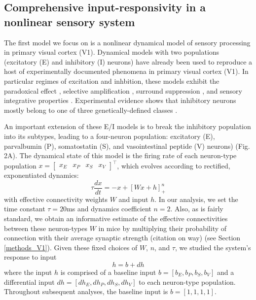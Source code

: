 \documentclass[11pt]{article}
\begin{document}
\subsection{Comprehensive input-responsivity in a nonlinear sensory system} \label{results_V1}
The first model we focus on is a nonlinear dynamical model of sensory processing in primary visual cortex (V1).
Dynamical models with two populations (excitatory (E) and inhibitory (I) neurons) have already been used to reproduce a host of experimentally documented phenomena in primary visual cortex (V1).  In particular regimes of excitation and inhbition, these models exhibit the paradoxical effect \cite{tsodyks1997paradoxical}, selective amplification \cite{murphy2009balanced}, surround suppression \cite{ozeki2009inhibitory}, and  sensory integrative properties \cite{rubin2015stabilized}.  Experimental evidence shows that inhibitory neurons mostly belong to one of three genetically-defined classes \cite{markram2004interneurons, rudy2011three}.  

An important extension of these E/I models is to break the inhibitory population into its subtypes, leading to a four-neuron population:  excitatory (E), parvalbumin (P), somatostatin (S), and vasointestinal peptide (V) neurons) \cite{litwin2016inhibitory} (Fig. 2A).
The dynamical state of this model is the firing rate of each neuron-type population $x = \begin{bmatrix} x_E & x_P & x_S & x_V \end{bmatrix}^\top$, which evolves according to rectified, exponentiated dynamics:
\begin{equation}
\tau \frac{dx}{dt} = -x + [W x+ h]_+^n
\end{equation}
with effective connectivity weights $W$ and input $h$.  In our analysis, we set the time constant $\tau = 20$ms and dynamics coefficient $n = 2$.  
Also, as is fairly standard, we obtain an informative estimate of the effective connectivities between these neuron-types $W$ in mice by multiplying their probability of connection with their average synaptic strength \cite{allen} (citation on way) (see Section \ref{methods_V1}).
Given these fixed choices of $W$, $n$, and $\tau$, we studied the system's response to input
\begin{equation}
h = b + dh
\end{equation} 
where the input $h$ is comprised of a baseline input $b = \left[ b_E, b_P , b_S , b_V \right]$ and a differential input $dh = \left[ dh_E , dh_P , dh_S , dh_V\right]$ to each neuron-type population.  Throughout subsequent analyses, the baseline input is $b = \left[ 1 ,1,1,1\right]$.  
\end{document}
